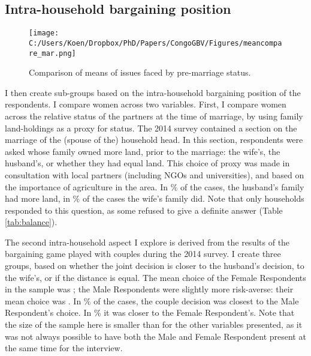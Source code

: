 \subsection{Intra-household bargaining position}
\begin{figure}[htb]
  \texttt{[image: C:/Users/Koen/Dropbox/PhD/Papers/CongoGBV/Figures/meancompare\_mar.png]}
  \caption{Comparison of means of issues faced by pre-marriage status.}
  \label{fig:meancompare_mar}
\end{figure}

I then create sub-groups based on the intra-household bargaining position of the respondents. I compare women across two variables. First, I compare women across the relative status of the partners at the time of marriage, by using family land-holdings as a proxy for status. The 2014 survey contained a section on the marriage of the (spouse of the) household head. In this section, respondents were asked whose family owned more land, prior to the marriage: the wife's, the husband's, or whether they had equal land. This choice of proxy was made in consultation with local partners (including NGOs and universities), and based on the importance of agriculture in the area. In \% of the cases, the husband's family had more land, in \% of the cases the wife's family did. Note that only  households responded to this question, as some refused to give a definite answer (Table \ref{tab:balance}). 

The second intra-household aspect I explore is derived from the results of the bargaining game played with couples during the 2014 survey. I create three groups, based on whether the joint decision is closer to the husband's decision, to the wife's, or if the distance is equal. The mean choice of the Female Respondents in the sample was ; the Male Respondents were slightly more risk-averse: their mean choice was . In \% of the cases, the couple decision was closest to the Male Respondent's choice. In \% it was closer to the Female Respondent's. Note that the size of the sample here is smaller than for the other variables presented, as it was not always possible to have both the Male and Female Respondent present at the same time for the interview.

